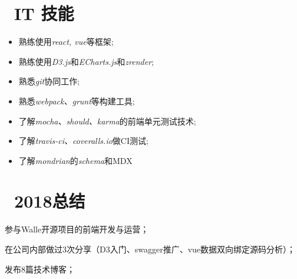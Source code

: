 \documentclass{resume}
\begin{document}
\section{\faCogs\ IT 技能}
\begin{itemize}[parsep=0.5ex]
  \item 熟练使用\textit{react, vue}等框架;
  \item 熟练使用\textit{D3.js}和\textit{ECharts.js}和\textit{zrender};
  \item 熟悉\textit{git}协同工作;
  \item 熟悉\textit{webpack、grunt}等构建工具;
  \item 了解\textit{mocha、should、karma}的前端单元测试技术;
  \item 了解\textit{travis-ci、coveralls.io}做CI测试;
  \item 了解\textit{mondrian}的\textit{schema}和MDX
\end{itemize}

\section{\faInfo\  2018总结}
\begin{onehalfspacing}
  \item 参与Walle开源项目的前端开发与运营；
  \item 在公司内部做过3次分享（D3入门、swagger推广、vue数据双向绑定源码分析）；
  \item 发布8篇技术博客；
\end{onehalfspacing}
\end{document}
